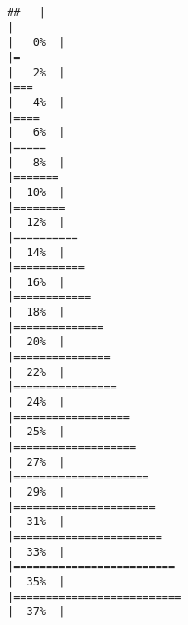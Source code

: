 \begin{verbatim}
##   |                                                                              |                                                                      |   0%  |                                                                              |=                                                                     |   2%  |                                                                              |===                                                                   |   4%  |                                                                              |====                                                                  |   6%  |                                                                              |=====                                                                 |   8%  |                                                                              |=======                                                               |  10%  |                                                                              |========                                                              |  12%  |                                                                              |==========                                                            |  14%  |                                                                              |===========                                                           |  16%  |                                                                              |============                                                          |  18%  |                                                                              |==============                                                        |  20%  |                                                                              |===============                                                       |  22%  |                                                                              |================                                                      |  24%  |                                                                              |==================                                                    |  25%  |                                                                              |===================                                                   |  27%  |                                                                              |=====================                                                 |  29%  |                                                                              |======================                                                |  31%  |                                                                              |=======================                                               |  33%  |                                                                              |=========================                                             |  35%  |                                                                              |==========================                                            |  37%  |                                                                              
\end{verbatim}
